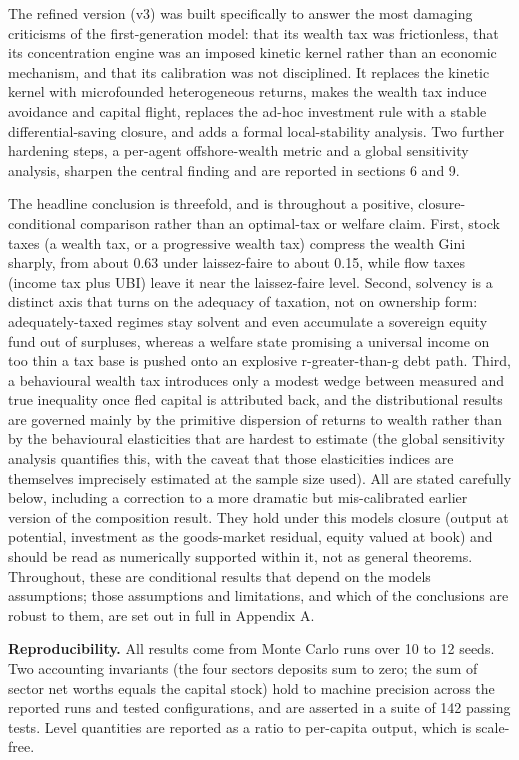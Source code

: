 \documentclass[12pt]{article}
\begin{document}
The refined version (v3) was built specifically to answer the most
damaging criticisms of the first-generation model: that its wealth tax
was frictionless, that its concentration engine was an imposed kinetic
kernel rather than an economic mechanism, and that its calibration was
not disciplined. It replaces the kinetic kernel with microfounded
heterogeneous returns, makes the wealth tax induce avoidance and capital
flight, replaces the ad-hoc investment rule with a stable
differential-saving closure, and adds a formal local-stability analysis.
Two further hardening steps, a per-agent offshore-wealth metric and a
global sensitivity analysis, sharpen the central finding and are
reported in sections 6 and 9.

The headline conclusion is threefold, and is throughout a positive,
closure-conditional comparison rather than an optimal-tax or welfare
claim. First, stock taxes (a wealth tax, or a progressive wealth tax)
compress the wealth Gini sharply, from about 0.63 under laissez-faire to
about 0.15, while flow taxes (income tax plus UBI) leave it near the
laissez-faire level. Second, solvency is a distinct axis that turns on
the adequacy of taxation, not on ownership form: adequately-taxed
regimes stay solvent and even accumulate a sovereign equity fund out of
surpluses, whereas a welfare state promising a universal income on too
thin a tax base is pushed onto an explosive r-greater-than-g debt path.
Third, a behavioural wealth tax introduces only a modest wedge between
measured and true inequality once fled capital is attributed back, and
the distributional results are governed mainly by the primitive
dispersion of returns to wealth rather than by the behavioural
elasticities that are hardest to estimate (the global sensitivity
analysis quantifies this, with the caveat that those
elasticities\textquotesingle{} indices are themselves imprecisely
estimated at the sample size used). All are stated carefully below,
including a correction to a more dramatic but mis-calibrated earlier
version of the composition result. They hold under this
model\textquotesingle s closure (output at potential, investment as the
goods-market residual, equity valued at book) and should be read as
numerically supported within it, not as general theorems. Throughout,
these are conditional results that depend on the model\textquotesingle s
assumptions; those assumptions and limitations, and which of the
conclusions are robust to them, are set out in full in Appendix A.

\textbf{Reproducibility.} All results come from Monte Carlo runs over 10
to 12 seeds. Two accounting invariants (the four
sectors\textquotesingle{} deposits sum to zero; the sum of sector net
worths equals the capital stock) hold to machine precision across the
reported runs and tested configurations, and are asserted in a suite of
142 passing tests. Level quantities are reported as a ratio to
per-capita output, which is scale-free.
\end{document}
